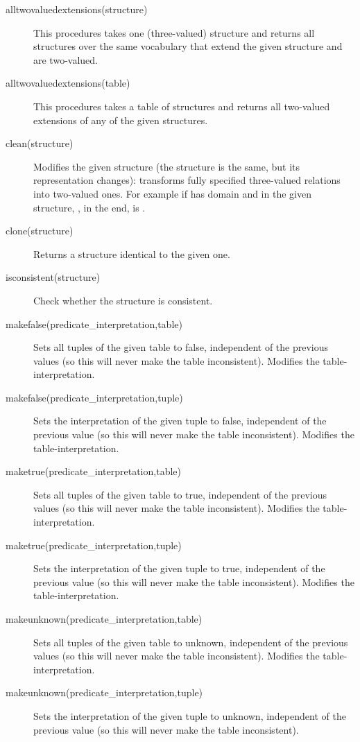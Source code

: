 \begin{description}
	\item[alltwovaluedextensions(structure)] This procedures takes one (three-valued) structure and returns all structures over the same vocabulary that extend the given structure and are two-valued.
	\item[alltwovaluedextensions(table)]
		This procedures takes a table of structures and returns all two-valued extensions of any of the given structures.
	\item[clean(structure)]
		Modifies the given structure (the structure is the same, but its representation changes): transforms fully specified three-valued relations into two-valued ones.  For example if  has domain \code{[1..2]} and in the given structure, , in the end,  is .
	\item[clone(structure)]
		Returns a structure identical to the given one.
	\item[isconsistent(structure)]
 		Check whether the structure is consistent.
	\item[makefalse(predicate\_interpretation,table)]
 		Sets all tuples of the given table to false, independent of the previous values (so this will never make the table inconsistent).
 		Modifies the table-interpretation.
	\item[makefalse(predicate\_interpretation,tuple)]
 		Sets the interpretation of the given tuple to false, independent of the previous value (so this will never make the table inconsistent).
 		Modifies the table-interpretation.
	\item[maketrue(predicate\_interpretation,table)]
 		Sets all tuples of the given table to true, independent of the previous values (so this will never make the table inconsistent).
 		Modifies the table-interpretation.
	\item[maketrue(predicate\_interpretation,tuple)]
 		Sets the interpretation of the given tuple to true, independent of the previous value (so this will never make the table inconsistent).
 		Modifies the table-interpretation.
	\item[makeunknown(predicate\_interpretation,table)]
 		Sets all tuples of the given table to unknown, independent of the previous values (so this will never make the table inconsistent).
 		Modifies the table-interpretation.
	\item[makeunknown(predicate\_interpretation,tuple)]
 		Sets the interpretation of the given tuple to unknown, independent of the previous value (so this will never make the table inconsistent).

\end{description}
